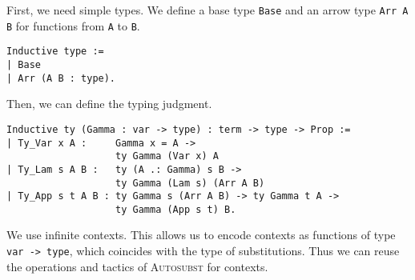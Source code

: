 \documentclass{scrartcl}
\newcommand{\Autosubst}{\textsc{Autosubst}\xspace}
\newcommand{\lst}{\lstinline}
\begin{document}
First, we need simple types. We define a base type \lst$Base$ and an arrow type \lst$Arr A B$ for functions from \lst$A$ to \lst$B$.
\begin{lstlisting}
Inductive type :=
| Base
| Arr (A B : type).
\end{lstlisting}
Then, we can define the typing judgment.
\begin{lstlisting}
Inductive ty (Gamma : var -> type) : term -> type -> Prop :=
| Ty_Var x A :     Gamma x = A -> 
                   ty Gamma (Var x) A
| Ty_Lam s A B :   ty (A .: Gamma) s B -> 
                   ty Gamma (Lam s) (Arr A B)
| Ty_App s t A B : ty Gamma s (Arr A B) -> ty Gamma t A -> 
                   ty Gamma (App s t) B.
\end{lstlisting}
We use infinite contexts. This allows us to encode contexts as functions of type \lst$var -> type$, which coincides with the type of substitutions. Thus we can reuse the operations and tactics of \Autosubst for contexts.
\end{document}
